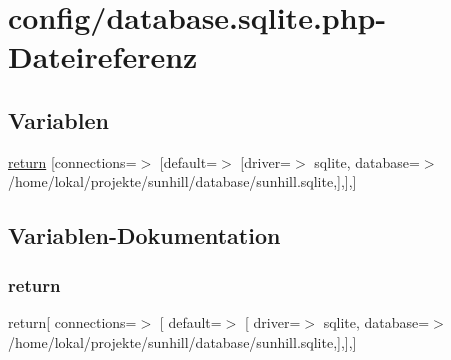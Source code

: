 \hypertarget{database_8sqlite_8php}{}\section{config/database.sqlite.\+php-\/\+Dateireferenz}
\label{database_8sqlite_8php}
\subsection*{Variablen}
\begin{DoxyCompactItemize}
\item 
\hyperlink{database_8sqlite_8php_a0852cd7871533ea0a0c07fe7c76d99b9}{return} \mbox{[}\textquotesingle{}connections\textquotesingle{}=$>$ \mbox{[}\textquotesingle{}default\textquotesingle{}=$>$ \mbox{[}\textquotesingle{}driver\textquotesingle{}=$>$ \textquotesingle{}sqlite\textquotesingle{}, \textquotesingle{}database\textquotesingle{}=$>$ \textquotesingle{}/home/lokal/projekte/sunhill/database/sunhill.\+sqlite\textquotesingle{},\mbox{]},\mbox{]},\mbox{]}
\end{DoxyCompactItemize}


\subsection{Variablen-\/\+Dokumentation}
\mbox{\label{database_8sqlite_8php_a0852cd7871533ea0a0c07fe7c76d99b9}} 
\subsubsection{\texorpdfstring{return}{return}}
{\footnotesize\ttfamily return\mbox{[} \textquotesingle{}connections\textquotesingle{}=$>$ \mbox{[} \textquotesingle{}default\textquotesingle{}=$>$ \mbox{[} \textquotesingle{}driver\textquotesingle{}=$>$ \textquotesingle{}sqlite\textquotesingle{}, \textquotesingle{}database\textquotesingle{}=$>$ \textquotesingle{}/home/lokal/projekte/sunhill/database/sunhill.\+sqlite\textquotesingle{},\mbox{]},\mbox{]},\mbox{]}}


